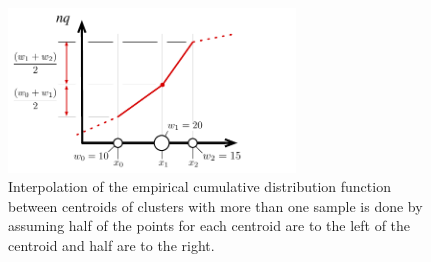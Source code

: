 \documentclass[]{statsoc}
\begin{document}
\begin{figure}[p] %
   \centering
   \includegraphics[width=3in]{quantile-figures/interpolation.pdf} 
   \caption{Interpolation of the empirical cumulative distribution function between centroids of clusters with more than one sample is done by assuming half of the points for each centroid are to the left of the centroid and half are to the right. }
   \label{fig:interpolation}
\end{figure}
\end{document}
